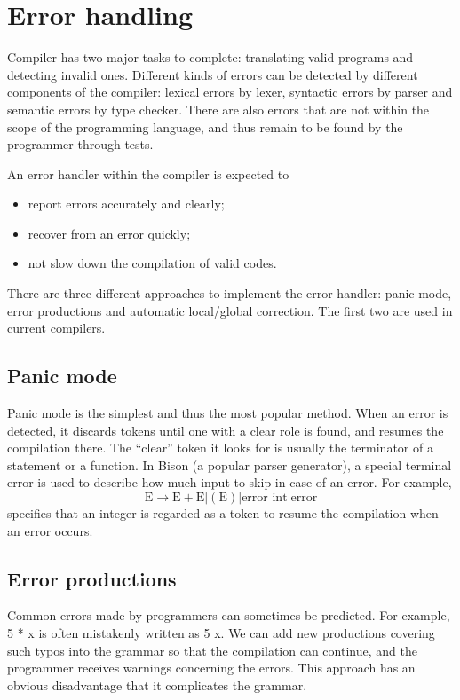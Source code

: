 \section{Error handling}
Compiler has two major tasks to complete: translating valid programs and detecting invalid ones. Different kinds of errors can be detected by different components of the compiler: lexical errors by lexer, syntactic errors by parser and semantic errors by type checker. There are also errors that are not within the scope of the programming language, and thus remain to be found by the programmer through tests.

An error handler within the compiler is expected to 
\begin{itemize}
\item report errors accurately and clearly;
\item recover from an error quickly;
\item not slow down the compilation of valid codes.
\end{itemize}
There are three different approaches to implement the error handler: panic mode, error productions and automatic local/global correction. The first two are used in current compilers.

\subsection{Panic mode}
Panic mode is the simplest and thus the most popular method. When an error is detected, it discards tokens until one with a clear role is found, and resumes the compilation there. The ``clear'' token it looks for is usually the terminator of a statement or a function. In Bison (a popular parser generator), a special terminal {\sf error} is used to describe how much input to skip in case of an error. For example,
\begin{equation*}
\text{E}\rightarrow \text{E} + \text{E} | (\text{E}) | \text{error int}|\text{error}
\end{equation*}
specifies that an integer is regarded as a token to resume the compilation when an error occurs.
\subsection{Error productions}
Common errors made by programmers can sometimes be predicted. For example, 5 * x is often mistakenly written as 5 x. We can add new productions covering such typos into the grammar so that the compilation can continue, and the programmer receives warnings concerning the errors. This approach has an obvious disadvantage that it complicates the grammar.
